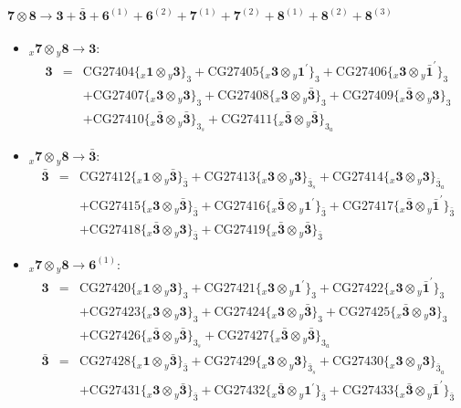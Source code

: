 \documentclass[english]{article}
\newcommand{\rep}[1]{\mathbf{#1}}
\newcommand{\repx}[2]{{}_{#2}\mathbf{#1}}
\newcommand{\subcg}[3]{\big\{ \repx{#1}{x}\otimes\repx{#2}{y}\big\}^{}_{#3}}
\begin{document}
\paragraph*{\Large $\rep{7}\otimes\rep{8}\to\rep{3}+\rep{\bar{3}}+\rep{6}^{(1)}+\rep{6}^{(2)}+\rep{7}^{(1)}+\rep{7}^{(2)}+\rep{8}^{(1)}+\rep{8}^{(2)}+\rep{8}^{(3)}$}
\begin{itemize}
\item $\repx{7}{x}\otimes\repx{8}{y}\to\rep{3}$:
\begin{eqnarray*}
\rep{3} &=& \text{CG27404}\subcg{1}{3}{3}+\text{CG27405}\subcg{3}{1^{\prime}}{3}+\text{CG27406}\subcg{3}{\bar{1}^{\prime}}{3} \\ 
 & & +\text{CG27407}\subcg{3}{3}{3}+\text{CG27408}\subcg{3}{\bar{3}}{3}+\text{CG27409}\subcg{\bar{3}}{3}{3} \\ 
 & & +\text{CG27410}\subcg{\bar{3}}{\bar{3}}{3_{s}}+\text{CG27411}\subcg{\bar{3}}{\bar{3}}{3_{a}}
\end{eqnarray*}
\item $\repx{7}{x}\otimes\repx{8}{y}\to\rep{\bar{3}}$:
\begin{eqnarray*}
\rep{\bar{3}} &=& \text{CG27412}\subcg{1}{\bar{3}}{\bar{3}}+\text{CG27413}\subcg{3}{3}{\bar{3}_{s}}+\text{CG27414}\subcg{3}{3}{\bar{3}_{a}} \\ 
 & & +\text{CG27415}\subcg{3}{\bar{3}}{\bar{3}}+\text{CG27416}\subcg{\bar{3}}{1^{\prime}}{\bar{3}}+\text{CG27417}\subcg{\bar{3}}{\bar{1}^{\prime}}{\bar{3}} \\ 
 & & +\text{CG27418}\subcg{\bar{3}}{3}{\bar{3}}+\text{CG27419}\subcg{\bar{3}}{\bar{3}}{\bar{3}}
\end{eqnarray*}
\item $\repx{7}{x}\otimes\repx{8}{y}\to\rep{6}^{(1)}$:
\begin{eqnarray*}
\rep{3} &=& \text{CG27420}\subcg{1}{3}{3}+\text{CG27421}\subcg{3}{1^{\prime}}{3}+\text{CG27422}\subcg{3}{\bar{1}^{\prime}}{3} \\ 
 & & +\text{CG27423}\subcg{3}{3}{3}+\text{CG27424}\subcg{3}{\bar{3}}{3}+\text{CG27425}\subcg{\bar{3}}{3}{3} \\ 
 & & +\text{CG27426}\subcg{\bar{3}}{\bar{3}}{3_{s}}+\text{CG27427}\subcg{\bar{3}}{\bar{3}}{3_{a}}
\\
\rep{\bar{3}} &=& \text{CG27428}\subcg{1}{\bar{3}}{\bar{3}}+\text{CG27429}\subcg{3}{3}{\bar{3}_{s}}+\text{CG27430}\subcg{3}{3}{\bar{3}_{a}} \\ 
 & & +\text{CG27431}\subcg{3}{\bar{3}}{\bar{3}}+\text{CG27432}\subcg{\bar{3}}{1^{\prime}}{\bar{3}}+\text{CG27433}\subcg{\bar{3}}{\bar{1}^{\prime}}{\bar{3}} \\ 

\end{eqnarray*}
\end{itemize}
\end{document}
